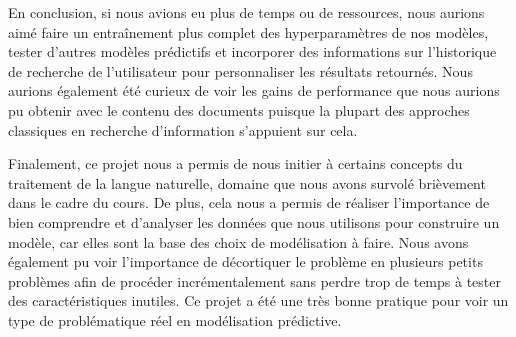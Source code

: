 En conclusion, si nous avions eu plus de temps ou de ressources, nous aurions aimé faire un entraînement plus complet des hyperparamètres de nos modèles, tester d'autres modèles prédictifs et incorporer des informations sur l'historique de recherche de l'utilisateur pour personnaliser les résultats retournés.
Nous aurions également été curieux de voir les gains de performance que nous aurions pu obtenir avec le contenu des documents puisque la plupart des approches classiques en recherche d'information s'appuient sur cela.
\break

Finalement, ce projet nous a permis de nous initier à certains concepts du traitement de la langue naturelle, domaine que nous avons survolé brièvement dans le cadre du cours. De plus, cela nous a permis de réaliser l'importance de bien comprendre et d'analyser les données que nous utilisons pour construire un modèle, car elles sont la base des choix de modélisation à faire. Nous avons également pu voir l'importance de décortiquer le problème en plusieurs petits problèmes afin de procéder incrémentalement sans perdre trop de temps à tester des caractéristiques inutiles. Ce projet a été une très bonne pratique pour voir un type de problématique réel en modélisation prédictive.
